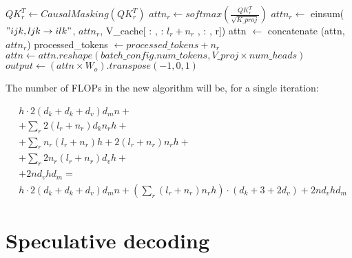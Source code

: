 \begin{algorithm}[H]
\begin{algorithmic}[1]
        \State $QK^T_r \leftarrow CausalMasking(QK^T_r)$
        \State $attn_r \leftarrow softmax\left(\frac{QK^T_r}{\sqrt{K\_proj}}\right)$
        \State $attn_r \leftarrow$ einsum($"ijk,ljk \rightarrow ilk"$, $attn_r$, V\_cache[ : , : $l_r + n_r$ , : , r])
        \State attn $\leftarrow$ concatenate (attn, $attn_r$)
        \State processed\_tokens $\leftarrow processed\_tokens + n_r$
    \EndFor
    \State $attn \leftarrow attn.reshape(batch\_config.num\_tokens, V\_proj \times num\_heads)$
    \State $output \leftarrow (attn \times W_{o}).transpose(-1,0,1)$
  \end{algorithmic}
\end{algorithm}

The number of FLOPs in the new algorithm will be, for a single iteration:

\begin{align}
    & h \cdot 2 (d_k + d_k + d_v) d_m  n + \\
    & + \sum_r 2 (l_r + n_r) d_k n_r h + \\
    & + \sum_r n_r (l_r + n_r) h + 2(l_r + n_r) n_r h + \\
    & + \sum_r 2 n_r (l_r + n_r) d_v h + \\
    & + 2 n d_v h d_m = \\
    & h \cdot 2 (d_k + d_k + d_v) d_m  n + (\sum_r (l_r + n_r) n_r h) \cdot (d_k + 3 + 2d_v) + 2 n d_v h d_m
\end{align}

\section{Speculative decoding}

